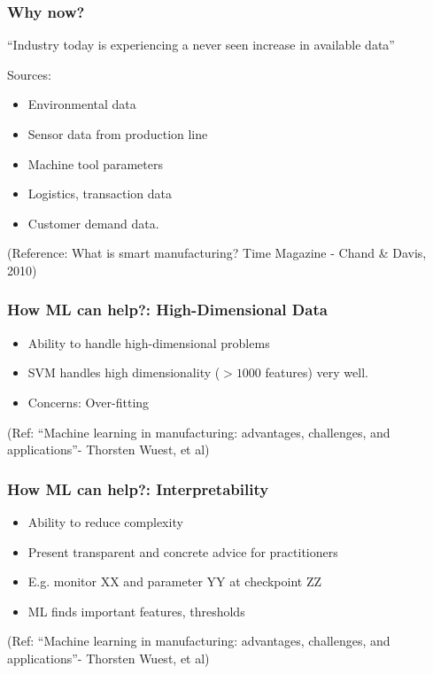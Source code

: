 \begin{frame}[fragile]\frametitle{Why now?}
\begin{center}
{\Large ``Industry today is experiencing a never seen increase in available data'' }
\end{center}
Sources:
\begin{itemize}
\item Environmental data
\item Sensor data from production line
\item Machine tool parameters
\item Logistics, transaction data
\item Customer demand data.
\end{itemize}
\tiny{(Reference: What is smart manufacturing? Time Magazine - Chand \& Davis, 2010)}
\end{frame}

\begin{frame}[fragile]\frametitle{How ML can help?: High-Dimensional Data}

\begin{itemize}
\item Ability to handle high-dimensional problems
\item SVM handles high dimensionality ($>1000$ features) very well.
\item Concerns: Over-fitting
\end{itemize}
{\tiny (Ref: ``Machine learning in manufacturing: advantages, challenges, and applications''- Thorsten Wuest, et al)}
\end{frame}


\begin{frame}[fragile]\frametitle{How ML can help?: Interpretability}

\begin{itemize}
\item Ability to reduce complexity
\item Present transparent and concrete advice for practitioners
\item E.g. monitor XX and parameter YY at checkpoint ZZ
\item ML finds important features, thresholds
\end{itemize}
{\tiny (Ref: ``Machine learning in manufacturing: advantages, challenges, and applications''- Thorsten Wuest, et al)}
\end{frame}

